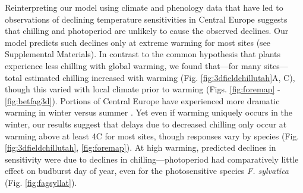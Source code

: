 \documentclass{article}
\begin{document}

\par Reinterpreting our model using climate and phenology data that have led to observations of declining temperature sensitivities in Central Europe suggests that chilling and photoperiod are unlikely to cause the observed declines. Our model predicts such declines only at extreme warming for most sites (see Supplemental Materials). In contrast to the common hypothesis that plants experience less chilling with global warming, we found that---for many sites---total estimated chilling increased with warming (Fig. \ref{fig:3dfieldchillutah}A, C), though this varied with local climate prior to warming (Figs. \ref{fig:foremap} - \ref{fig:betfag3d}). 
Portions of Central Europe have experienced more dramatic warming in winter versus summer \emph{\citep[][though this certainly varies over time and space, \citet{li2015}]{balling1998}}. Yet even if warming uniquely occurs in the winter, our results suggest that delays due to decreased chilling only occur at warming above at least 4\degree C for most sites, though responses vary by species (Fig. \ref{fig:3dfieldchillutah}, \ref{fig:foremap}). At high warming, predicted declines in sensitivity were due to declines in chilling---photoperiod had comparatively little effect on budburst day of year, even for the photosensitive species \emph{F. sylvatica} (Fig. \ref{fig:fagsyllat}). 
\end{document}
